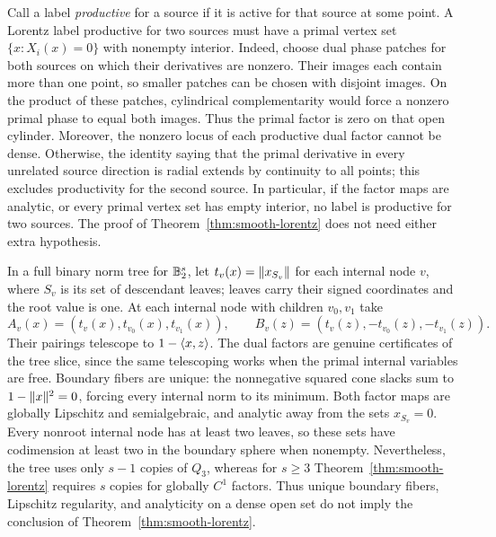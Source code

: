 \begin{remark}\label{rem:switching}
Call a label \emph{productive} for a source if it is active for that
source at some point. A Lorentz label productive for two sources must
have a primal vertex set $\{x:X_i(x)=0\}$ with nonempty interior. Indeed, choose dual phase patches for both sources
on which their derivatives are nonzero. Their images each contain more
than one point, so smaller patches can be chosen with disjoint images.
On the product of these patches, cylindrical complementarity would force
a nonzero primal phase to equal both images. Thus the primal factor is
zero on that open cylinder. Moreover, the nonzero locus of each
productive dual factor cannot be dense. Otherwise, the identity saying
that the primal derivative in every unrelated source direction is radial
extends by continuity to all points; this excludes productivity for the
second source. In particular, if the factor maps are analytic, or every
primal vertex set has empty interior, no label is productive for two
sources. The proof of
Theorem~\ref{thm:smooth-lorentz} does not need either extra hypothesis.
\end{remark}

\begin{example}\label{ex:tree-regularity}
In a full binary norm tree for $\mathbb B_2^s$, let $t_v(x)=\lVert x_{S_v}\rVert$
for each internal node $v$, where $S_v$ is its set of descendant leaves;
leaves carry their signed coordinates and the root value is one.
At each internal node with children $v_0,v_1$ take
\[
 A_v(x)=(t_v(x),t_{v_0}(x),t_{v_1}(x)),\qquad
 B_v(z)=(t_v(z),-t_{v_0}(z),-t_{v_1}(z)).
\]
Their pairings telescope to $1-\langle x,z\rangle$. The dual factors are genuine
certificates of the tree slice, since the same telescoping works when
the primal internal variables are free. Boundary fibers are unique:
the nonnegative squared cone slacks sum to $1-\lVert x\rVert^2=0$, forcing
every internal norm to its minimum. Both factor maps are globally
Lipschitz and semialgebraic, and analytic away from the sets
$x_{S_v}=0$. Every nonroot internal node has at least two leaves, so
these sets have codimension at least two in the boundary sphere when
nonempty. Nevertheless, the tree uses only $s-1$ copies of $Q_3$, whereas
for $s\geq3$ Theorem~\ref{thm:smooth-lorentz} requires $s$ copies for
globally $C^1$ factors. Thus unique boundary fibers, Lipschitz
regularity, and analyticity on a dense open set do not imply the
conclusion of Theorem~\ref{thm:smooth-lorentz}.
\end{example}

